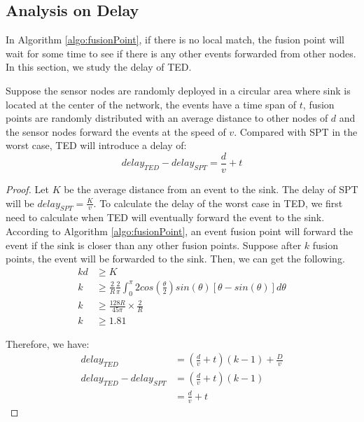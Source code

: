 \subsection{Analysis on Delay}
In Algorithm \ref{algo:fusionPoint}, if there is no local match, the fusion point will wait for some time to see if there is any other events forwarded from other nodes. In this section, we study the delay of TED.
\begin{theorem}
\label{thm:delay}
Suppose the sensor nodes are randomly deployed in a circular area where sink is located at the center of the network, the events have a time span of \(t\), fusion points are randomly distributed with an average distance to other nodes of \(d\) and the sensor nodes forward the events at the speed of \(v\). Compared with SPT in the worst case, TED will introduce a delay of:
\begin{equation*}
delay_{TED}-delay_{SPT}=\frac{d}{v}+t
\end{equation*}
\end{theorem}

\begin{proof}
Let \(K\) be the average distance from an event to the sink. The delay of SPT will be \(delay_{SPT}=\frac{K}{v}\). To calculate the delay of the worst case in TED, we first need to calculate when TED will eventually forward the event to the sink. According to Algorithm \ref{algo:fusionPoint}, an event fusion point will forward the event if the sink is closer than any other fusion points. Suppose after \(k\) fusion points, the event will be forwarded to the sink. Then, we can get the following.
\begin{align*}
kd&\geq K\\
k&\geq \frac{2}{R}\frac{2}{\pi}\int_0^{\pi}2cos(\frac{\theta}{2})sin(\theta)[\theta-sin(\theta)]d\theta\\
k&\geq \frac{128R}{45\pi}\times\frac{2}{R}\\
k&\geq 1.81
\end{align*}

Therefore, we have:
\begin{align*}
delay_{TED}&=(\frac{d}{v}+t)(k-1)+\frac{D}{v}\\
delay_{TED}-delay_{SPT}&=(\frac{d}{v}+t)(k-1)\\
&=\frac{d}{v}+t
\end{align*}
\end{proof}